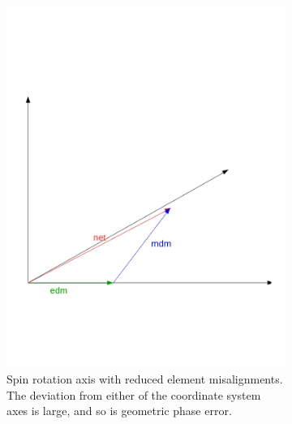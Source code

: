 \documentclass{article}
\begin{document}
\begin{figure}
  \centering
  \begin{subfigure}[b]{.5\textwidth}\centering
    \includegraphics[width=\textwidth]{img/geometric_phase_1}
    \caption{Spin rotation axis with reduced element misalignments. The deviation from either of the coordinate system axes is large, and so is geometric phase error.}
  \end{subfigure}~
  \begin{subfigure}[b]{.5\textwidth}\centering

\end{subfigure}
\end{figure}
\end{document}

